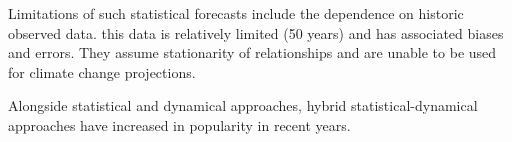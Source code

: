 



Limitations of such statistical forecasts include the dependence on historic observed data. this data is relatively limited (50 years) and has associated biases and errors. They assume stationarity of relationships and are unable to be used for climate change projections.



Alongside statistical and dynamical approaches, hybrid statistical-dynamical approaches have increased in popularity in recent years.


